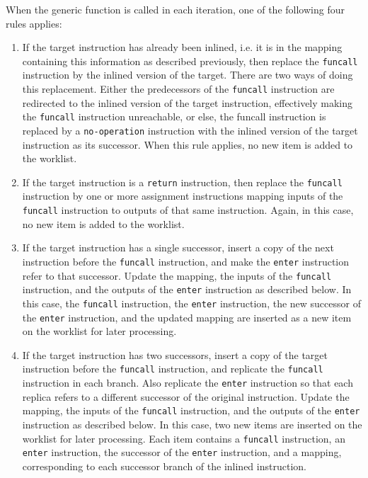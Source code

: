 When the generic function is called in each iteration, one of the
following four rules applies:

\begin{enumerate}
\item If the target instruction has already been inlined, i.e. it is
  in the mapping containing this information as described previously,
  then replace the \texttt{funcall} instruction by the inlined version
  of the target.  There are two ways of doing this replacement.
  Either the predecessors of the \texttt{funcall} instruction are
  redirected to the inlined version of the target instruction,
  effectively making the \texttt{funcall} instruction unreachable, or
  else, the funcall instruction is replaced by a \texttt{no-operation}
  instruction with the inlined version of the target instruction as
  its successor.  When this rule applies, no new item is added to the
  worklist.
\item If the target instruction is a \texttt{return} instruction, then
  replace the \texttt{funcall} instruction by one or more assignment
  instructions mapping inputs of the \texttt{funcall} instruction to
  outputs of that same instruction.  Again, in this case, no new item
  is added to the worklist.
\item If the target instruction has a single successor, insert a copy of
  the next instruction before the \texttt{funcall} instruction, and
  make the \texttt{enter} instruction refer to that successor.  Update
  the mapping, the inputs of the \texttt{funcall} instruction, and the
  outputs of the \texttt{enter} instruction as described below.  In
  this case, the \texttt{funcall} instruction, the \texttt{enter}
  instruction, the new successor of the \texttt{enter} instruction,
  and the updated mapping are inserted as a new item on the worklist
  for later processing.
\item If the target instruction has two successors, insert a copy of
  the target instruction before the \texttt{funcall} instruction, and
  replicate the \texttt{funcall} instruction in each branch.  Also
  replicate the \texttt{enter} instruction so that each replica refers
  to a different successor of the original instruction.  Update the
  mapping, the inputs of the \texttt{funcall} instruction, and the
  outputs of the \texttt{enter} instruction as described below.  In
  this case, two new items are inserted on the worklist for later
  processing.  Each item contains a \texttt{funcall} instruction, an
  \texttt{enter} instruction, the successor of the \texttt{enter}
  instruction, and a mapping, corresponding to each successor branch
  of the inlined instruction.
\end{enumerate}

